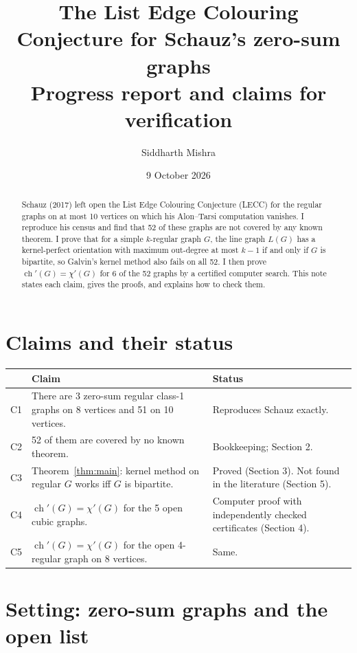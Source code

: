 \documentclass[11pt]{article}
\title{The List Edge Colouring Conjecture for Schauz's zero-sum graphs\\[2pt]
\large Progress report and claims for verification}
\author{Siddharth Mishra}
\date{9 October 2026}
\theoremstyle{plain}
\theoremstyle{definition}
\theoremstyle{remark}
\newcommand{\ch}{\operatorname{ch}}
\begin{document}
\maketitle

\begin{abstract}
\noindent Schauz (2017) left open the List Edge Colouring Conjecture (LECC) for the regular
graphs on at most 10 vertices on which his Alon--Tarsi computation vanishes. I reproduce his
census and find that 52 of these graphs are not covered by any known theorem. I prove that for
a simple $k$-regular graph $G$, the line graph $L(G)$ has a kernel-perfect orientation with
maximum out-degree at most $k-1$ if and only if $G$ is bipartite, so Galvin's kernel method also
fails on all 52. I then prove $\ch'(G) = \chi'(G)$ for 6 of the 52 graphs by a certified
computer search. This note states each claim, gives the proofs, and explains how to check
them.
\end{abstract}

\section{Claims and their status}

\begin{center}
\begin{tabular}{p{0.6cm}p{8.4cm}p{5.4cm}}
\toprule
& Claim & Status \\
\midrule
C1 & There are 3 zero-sum regular class-1 graphs on 8 vertices and 51 on 10 vertices. &
Reproduces Schauz \cite{schauz} exactly. \\
C2 & 52 of them are covered by no known theorem. & Bookkeeping; Section 2. \\
C3 & Theorem~\ref{thm:main}: kernel method on regular $G$ works iff $G$ is bipartite. &
Proved (Section 3). Not found in the literature (Section 5). \\
C4 & $\ch'(G) = \chi'(G)$ for the 5 open cubic graphs. & Computer proof with independently
checked certificates (Section 4). \\
C5 & $\ch'(G) = \chi'(G)$ for the open 4-regular graph on 8 vertices. & Same. \\
\bottomrule
\end{tabular}
\end{center}

\section{Setting: zero-sum graphs and the open list}
\end{document}
